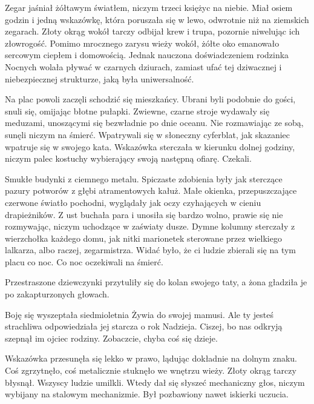 Zegar jaśniał żółtawym światłem, niczym trzeci księżyc na niebie.
Miał osiem godzin i jedną wskazówkę, która poruszała się w lewo, odwrotnie niż na ziemskich zegarach.
Złoty okrąg wokół tarczy odbijał krew i trupa, pozornie niwelując ich złowrogość.
Pomimo mrocznego zarysu wieży wokół, żółte oko emanowało sercowym ciepłem i domowością.
Jednak nauczona doświadczeniem rodzinka Nocnych wolała pływać w czarnych dziurach, zamiast ufać tej dziwacznej i niebezpiecznej strukturze, jaką była uniwersalność.

Na plac powoli zaczęli schodzić się mieszkańcy.
Ubrani byli podobnie do gości, snuli się, omijając błotne pułapki.
Zwiewne, czarne stroje wydawały się meduzami, unoszącymi się bezwładnie po dnie oceanu.
Nie rozmawiając ze sobą, sunęli niczym na śmierć.
Wpatrywali się w słoneczny cyferblat, jak skazaniec wpatruje się w swojego kata.
Wskazówka sterczała w kierunku dolnej godziny, niczym palec kostuchy wybierający swoją następną ofiarę.
Czekali.

Smukłe budynki z ciemnego metalu.
Spiczaste zdobienia były jak sterczące pazury potworów z głębi atramentowych kałuż.
Małe okienka, przepuszczające czerwone światło pochodni, wyglądały jak oczy czyhających w cieniu drapieżników.
Z ust buchała para i unosiła się bardzo wolno, prawie się nie rozmywając, niczym uchodzące w zaświaty dusze.
Dymne kolumny sterczały z wierzchołka każdego domu, jak nitki marionetek sterowane przez wielkiego lalkarza, albo raczej, zegarmistrza.
Widać było, że ci ludzie zbierali się na tym placu co noc.
Co noc oczekiwali na śmierć.

Przestraszone dziewczynki przytuliły się do kolan swojego taty, a żona gładziła je po zakapturzonych głowach.
\begin{dialogue}
	\ds{} Boję się \dm{} wyszeptała siedmioletnia Żywia do swojej mamusi.
	\ds{} Ale ty jesteś strachliwa \dm{} odpowiedziała jej starcza o rok Nadzieja.
	\ds{} Ciszej, bo nas odkryją \dm{} szepnął im ojciec rodziny. \dm{} Zobaczcie, chyba coś się dzieje.
\end{dialogue}

Wskazówka przesunęła się lekko w prawo, lądując dokładnie na dolnym znaku. 
Coś zgrzytnęło, coś metalicznie stuknęło we wnętrzu wieży.
Złoty okrąg tarczy błysnął.
Wszyscy ludzie umilkli.
Wtedy dał się słyszeć mechaniczny głos, niczym wybijany na stalowym mechanizmie.
Był pozbawiony nawet iskierki uczucia.

